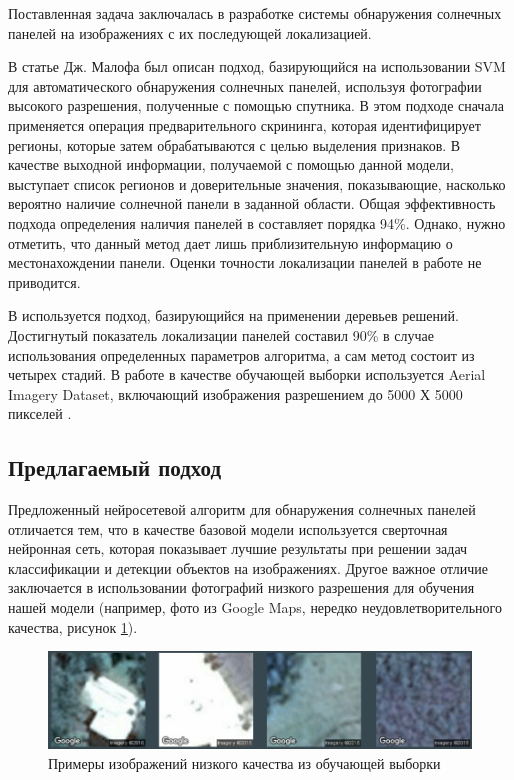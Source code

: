 Поставленная задача заключалась в разработке системы обнаружения солнечных панелей на изображениях с их последующей локализацией.

В статье Дж. Малофа \cite{malof2015} был описан подход, базирующийся на использовании SVM для автоматического обнаружения солнечных панелей, используя фотографии высокого разрешения, полученные с помощью спутника. В этом подходе сначала применяется операция предварительного скрининга, которая идентифицирует регионы, которые затем обрабатываются с целью выделения признаков. В качестве выходной информации, получаемой с помощью данной модели, выступает список регионов и доверительные значения, показывающие, насколько вероятно наличие солнечной панели в заданной области. Общая эффективность подхода определения наличия панелей в \cite{malof2015} составляет порядка 94\%. Однако, нужно отметить, что данный метод дает лишь приблизительную информацию о местонахождении панели. Оценки точности локализации панелей в работе не приводится.

В \cite{malof2016} используется подход, базирующийся на применении деревьев решений. Достигнутый показатель локализации панелей составил 90\% в случае использования определенных параметров алгоритма, а сам метод состоит из четырех стадий. В работе в качестве обучающей выборки используется Aerial Imagery Dataset, включающий изображения разрешением до 5000 Х 5000 пикселей \cite{bradbury2016}.

\subsection{Предлагаемый подход}

Предложенный нейросетевой алгоритм для обнаружения солнечных панелей отличается тем, что в качестве базовой модели используется сверточная нейронная сеть, которая показывает лучшие результаты при решении задач классификации и детекции объектов на изображениях. Другое важное отличие заключается в использовании фотографий низкого разрешения для обучения нашей модели (например, фото из Google Maps, нередко неудовлетворительного качества, рисунок \ref{fig:example_of_images}). 

\begin{figure}[ht]
	\centering
	\includegraphics[width=16cm]{man-source/images/ch4/pic4-16.png}
	\caption{Примеры изображений низкого качества из обучающей выборки}
	\label{fig:example_of_images}
\end{figure}

